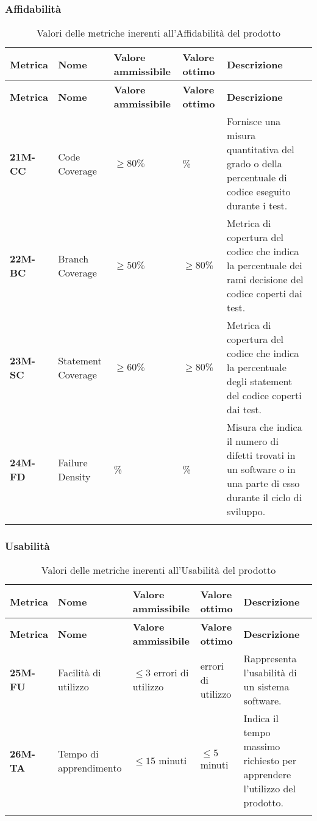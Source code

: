 \subsubsection{Affidabilità}
\begin{longtable}{|>{\centering\arraybackslash}p{}|>{\centering\arraybackslash}p{}|>{\centering\arraybackslash}p{}|>{\centering\arraybackslash}p{}|>{\centering\arraybackslash}p{}|}
    \hline
    \textbf{Metrica} & \textbf{Nome} & \textbf{Valore ammissibile} & \textbf{Valore ottimo}& \textbf{Descrizione}\\
	\hline
    \endfirsthead
    \hline
    \textbf{Metrica} & \textbf{Nome} & \textbf{Valore ammissibile} & \textbf{Valore ottimo}& \textbf{Descrizione}\\
    \endhead
	\hline
	\textbf{21M-CC} & Code Coverage & $\geq 80\% $  & 100\% & Fornisce una misura quantitativa del grado o della percentuale di codice eseguito durante i test.\\
	\hline
	\textbf{22M-BC} & Branch Coverage & $\geq 50\% $  & $\geq 80\% $ & Metrica di copertura del codice che indica la percentuale dei rami decisione del codice coperti dai test.\\ 
	\hline
	\textbf{23M-SC} & Statement Coverage & $\geq 60\% $ & $\geq 80\% $ & Metrica di copertura del codice che indica la percentuale degli statement del codice coperti dai test.\\ 
	\hline
	\textbf{24M-FD} & Failure Density & 100\%  & 100\%  & Misura che indica il numero di difetti trovati in un software o in una parte di esso durante il ciclo di sviluppo.\\ 
	\hline
	\caption{ Valori delle metriche inerenti all'Affidabilità del prodotto}
	\label{table:8}
\end{longtable}
\newpage
\subsubsection{Usabilità}
\begin{longtable}{|>{\centering\arraybackslash}p{}|>{\centering\arraybackslash}p{}|>{\centering\arraybackslash}p{}|>{\centering\arraybackslash}p{}|>{\centering\arraybackslash}p{}|}
    \hline
    \textbf{Metrica} & \textbf{Nome} & \textbf{Valore ammissibile} & \textbf{Valore ottimo}& \textbf{Descrizione}\\
	\hline
    \endfirsthead
    \hline
    \textbf{Metrica} & \textbf{Nome} & \textbf{Valore ammissibile} & \textbf{Valore ottimo}& \textbf{Descrizione}\\
    \endhead
	\textbf{25M-FU} & Facilità di utilizzo & $\leq 3 $ errori di utilizzo & 0 errori di utilizzo & Rappresenta l'usabilità di un sistema software.\\
	\hline
	\textbf{26M-TA} & Tempo di apprendimento & $\leq 15 $ minuti  & $\leq 5 $ minuti & Indica il tempo massimo richiesto per apprendere l'utilizzo del prodotto. \\ 
	\hline
	\caption{ Valori delle metriche inerenti all'Usabilità del prodotto}
	\label{table:9}
\end{longtable}
